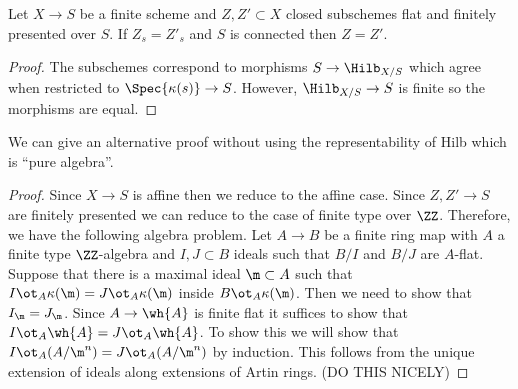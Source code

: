 \documentclass[12pt]{article}
\begin{document}
\begin{prop}
Let $X \to S$ be a finite \etale scheme and $Z, Z' \subset X$ closed subschemes flat and finitely presented over $S$. If $Z_s = Z'_s$ and $S$ is connected then $Z = Z'$.
\end{prop}

\begin{proof}
The subschemes correspond to morphisms $S \to \Hilb_{X/S}$ which agree when restricted to $\Spec{\kappa(s)} \to S$. However, $\Hilb_{X/S} \to S$ is finite \etale so the morphisms are equal.
\end{proof}

\begin{rmk}
We can give an alternative proof without using the representability of Hilb which is ``pure algebra''. 
\end{rmk}

\begin{proof}
Since $X \to S$ is affine then we reduce to the affine case. Since $Z, Z' \to S$ are finitely presented we can reduce to the case of finite type over $\ZZ$. Therefore, we have the following algebra problem. Let $A \to B$ be a finite \etale ring map with $A$ a finite type $\ZZ$-algebra and $I, J \subset B$ ideals such that $B/I$ and $B/J$ are $A$-flat. Suppose that there is a maximal ideal $\m \subset A$ such that $I \ot_A \kappa(\m) = J \ot_A \kappa(\m)$ inside $B \ot_A \kappa(\m)$. Then we need to show that $I_\m = J_\m$. Since $A \to \wh{A}$ is finite flat it suffices to show that $I \ot_A \wh{A} = J \ot_A \wh{A}$. To show this we will show that $I \ot_A (A/\m^n) = J \ot_A (A / \m^n)$ by induction. This follows from the unique extension of ideals along extensions of Artin rings. (DO THIS NICELY) 
\end{proof}
\end{document}
